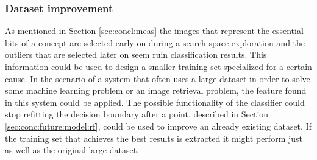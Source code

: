 \subsubsection{Dataset improvement}
\label{sec:conc:future:misc:data}

As mentioned in Section \ref{sec:concl:meas} the images that represent the essential bits of a concept are selected early on during a search space exploration and the outliers that are selected later on seem ruin classification results. This information could be used to design a smaller training set specialized for a certain cause. 
In the scenario of a system that often uses a large dataset in order to solve some machine learning problem or an image retrieval problem, the feature found in this system could be applied. The possible functionality of the classifier could stop refitting the decision boundary after a point, described in Section \ref{sec:conc:future:model:rf}, could be used to improve an already existing dataset. If the training set that achieves the best results is extracted it might perform just as well as the original large dataset.

